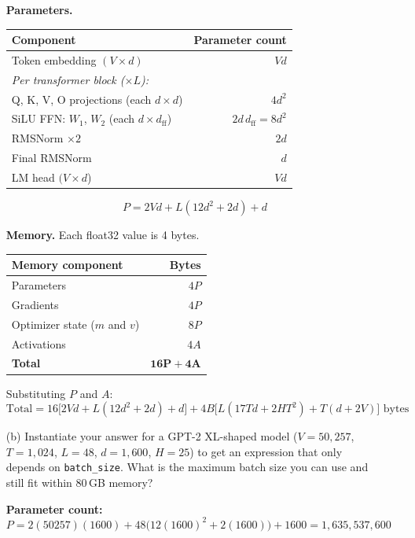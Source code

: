 \documentclass[letterpaper]{article}
\begin{document}
\begin{itemize}
		\textbf{Parameters.}

	\begin{center}
		\begin{tabular}{lr}
			\hline
			\textbf{Component} & \textbf{Parameter count} \\
			\hline
			Token embedding $(V \times d)$ & $Vd$ \\
			\hline
			\multicolumn{2}{l}{\textit{Per transformer block ($\times L$):}} \\
			\quad Q, K, V, O projections (each $d\times d$) & $4d^2$ \\
			\quad SiLU FFN: $W_1$, $W_2$ (each $d\times d_\text{ff}$) & $2d\,d_\text{ff} = 8d^2$ \\
			\quad RMSNorm $\times 2$ & $2d$ \\
			\hline
			Final RMSNorm & $d$ \\
			LM head $(V \times d$) & $Vd$ \\
			\hline
		\end{tabular}
	\end{center}
	\[
	P = 2Vd + L(12d^2 + 2d) + d
	\]

	\textbf{Memory.} Each float32 value is 4 bytes.

	\begin{center}
	\begin{tabular}{lr}
	\hline
	\textbf{Memory component} & \textbf{Bytes} \\
	\hline
	Parameters & $4P$ \\
	Gradients & $4P$ \\
	Optimizer state ($m$ and $v$) & $8P$ \\
	Activations & $4A$ \\
	\hline
	\textbf{Total} & $\mathbf{16P + 4A}$ \\
	\hline
	\end{tabular}
	\end{center}

	Substituting $P$ and $A$:
	\[
		\text{Total} = 16\bigl[2Vd + L(12d^2 + 2d) + d\bigr] + 4B\bigl[L(17Td + 2HT^2) + T(d + 2V)\bigr] \text{ bytes}
	\]

	\item[(b)] Instantiate your answer for a GPT-2 XL-shaped model ($V=50{,}257$, $T=1{,}024$, $L=48$, $d=1{,}600$, $H=25$) to get an expression that only depends on \texttt{batch\_size}. What is the maximum batch size you can use and still fit within 80\,GB memory?

	\textbf{Parameter count:}
	\[
		P = 2(50257)(1600) + 48\bigl(12(1600)^2 + 2(1600)\bigr) + 1600 = 1{,}635{,}537{,}600
	\]


\end{itemize}
\end{document}
